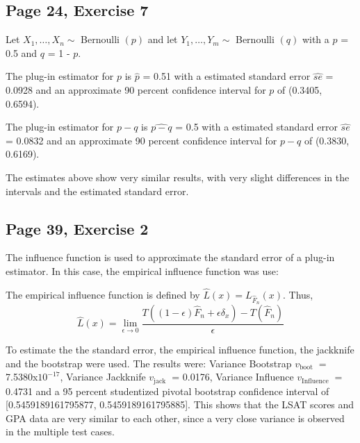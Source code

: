 \documentclass[11pt]{article}
\theoremstyle{definition}
\theoremstyle{remark}
\theoremstyle{remark}
\begin{document}
\subsection*{Page 24, Exercise 7}

Let $X_{1}, \ldots, X_{n} \sim$ Bernoulli $(p)$ and let
$Y_{1}, \ldots, Y_{m} \sim$ Bernoulli $(q)$ with a $p$ = 0.5 and $q$ =
1 - $p$.

The plug-in estimator for $p$ is $\widehat{p}$ = 0.51 with a estimated
standard error $\widehat{se}$ = 0.0928 and an approximate 90 percent
confidence interval for $p$ of (0.3405, 0.6594).

The plug-in estimator for $p-q$ is $\widehat{p-q}$ = 0.5 with a
estimated standard error $\widehat{se}$ = 0.0832 and an approximate 90
percent confidence interval for $p-q$ of (0.3830, 0.6169).

The estimates above show very similar results, with very slight
differences in the intervals and the estimated standard error.

\subsection*{Page 39, Exercise 2}

The influence function is used to approximate the standard error of a
plug-in estimator. In this case, the empirical influence function was
use:

The empirical influence function is defined by
$\widehat{L}(x)=L_{\widehat{F}_{n}}(x) .$ Thus,
\[
  \widehat{L}(x)=\lim _{\epsilon \rightarrow 0}
  \frac{T\left((1-\epsilon) \widehat{F}_{n}+\epsilon
      \delta_{x}\right)-T\left(\widehat{F}_{n}\right)}{\epsilon}
\]

To estimate the the standard error, the empirical influence function,
the jackknife and the bootstrap were used. The results were: Variance
Bootstrap $v_{\text {boot }}$ = 7.5380x$10^{-17}$, Variance Jackknife
$v_{\text {jack }}$ = 0.0176, Variance Influence
$v_{\text {Influence }}$ = 0.4731 and a 95 percent studentized pivotal
bootstrap confidence interval of [0.5459189161795877,
0.5459189161795885]. This shows that the LSAT scores and GPA data are
very similar to each other, since a very close variance is observed in
the multiple test cases.
\end{document}
